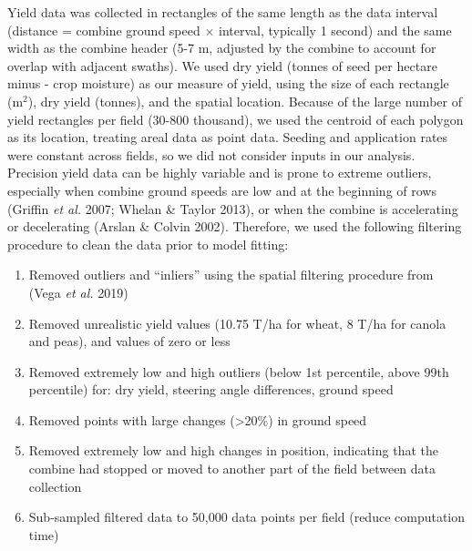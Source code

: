 \documentclass[]{elsarticle} %
\providecommand{\tightlist}{%
  \setlength{\itemsep}{0pt}\setlength{\parskip}{0pt}}
\begin{document}
Yield data was collected in rectangles of the same length as the data interval (distance = combine ground speed \(\times\) interval, typically 1 second) and the same width as the combine header (5-7 m, adjusted by the combine to account for overlap with adjacent swaths).
We used dry yield (tonnes of seed per hectare minus - crop moisture) as our measure of yield, using the size of each rectangle (m\(^2\)), dry yield (tonnes), and the spatial location.
Because of the large number of yield rectangles per field (30-800 thousand), we used the centroid of each polygon as its location, treating areal data as point data.
Seeding and application rates were constant across fields, so we did not consider inputs in our analysis.
Precision yield data can be highly variable and is prone to extreme outliers, especially when combine ground speeds are low and at the beginning of rows (Griffin \emph{et al.} 2007; Whelan \& Taylor 2013), or when the combine is accelerating or decelerating (Arslan \& Colvin 2002).
Therefore, we used the following filtering procedure to clean the data prior to model fitting:

\begin{enumerate}
\def\labelenumi{\arabic{enumi}.}
\tightlist
\item
  Removed outliers and ``inliers'' using the spatial filtering procedure from (Vega \emph{et al.} 2019)
\item
  Removed unrealistic yield values (10.75 T/ha for wheat, 8 T/ha for canola and peas), and values of zero or less
\item
  Removed extremely low and high outliers (below 1st percentile, above 99th percentile) for: dry yield, steering angle differences, ground speed
\item
  Removed points with large changes (\textgreater20\%) in ground speed
\item
  Removed extremely low and high changes in position, indicating that the combine had stopped or moved to another part of the field between data collection
\item
  Sub-sampled filtered data to 50,000 data points per field (reduce computation time)
\end{enumerate}
\end{document}
